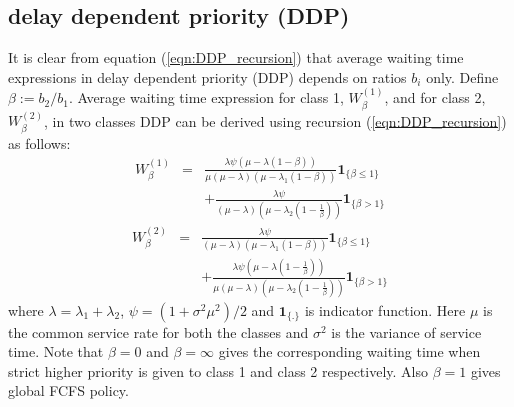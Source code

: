 \documentclass[letterpaper, 10 pt, conference]{ieeeconf}  %
\newtheorem{claim}[thm]{Claim}
\begin{document}




\begin{appendices}
\section{delay dependent priority (DDP)}
\label{proof:DDP_cmplt}
It is clear from equation (\ref{eqn:DDP_recursion}) that average waiting time expressions in delay dependent priority (DDP) depends on ratios $b_i$ only. Define $\beta := b_2/b_1$. Average waiting time expression for class 1, $W_{\beta}^{(1)}$, and for class 2, $W_{\beta}^{(2)}$, in two classes DDP can be derived using recursion (\ref{eqn:DDP_recursion}) as follows:
\begin{eqnarray}\nonumber
W_{\beta}^{(1)} &=& \frac{\lambda \psi (\mu-\lambda(1-\beta))}{\mu(\mu-\lambda)(\mu-\lambda_1(1-\beta))}\mathbf{1}_{\{\beta \leq 1\}}\\\label{eqn:DDPclass1}
&&+\frac{\lambda \psi }{(\mu-\lambda)(\mu -\lambda_2(1-\frac{1}{\beta}))}\mathbf{1}_{\{\beta > 1\}}
\end{eqnarray}
\begin{eqnarray}\nonumber
W_{\beta}^{(2)} &=&\frac{\lambda \psi}{(\mu-\lambda)(\mu -\lambda_1(1-\beta))}\mathbf{1}_{\{\beta \leq 1\}}\\\label{eqn:DDPclass2}
&&+ \frac{\lambda \psi(\mu-\lambda(1-\frac{1}{\beta}))}{\mu(\mu-\lambda)(\mu-\lambda_2(1-\frac{1}{\beta}))}\mathbf{1}_{\{\beta > 1\}}
\end{eqnarray}
where $\lambda = \lambda_1 + \lambda_2$, $\psi = (1+\sigma^2 \mu^2)/2$ and $\mathbf{1_{\{.\}}}$ is indicator function. Here $\mu$ is the common service rate for both the classes and $\sigma^2$ is the variance of service time. Note that $\beta = 0$ and $\beta = \infty$ gives the corresponding waiting time when strict higher priority is given to class 1 and class 2 respectively. Also $\beta = 1$ gives global FCFS policy. %


\end{appendices}
\end{document}
